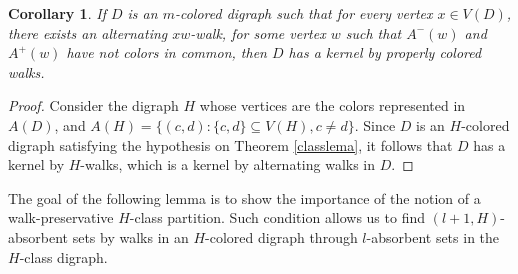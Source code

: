 \documentclass[10pt,a4paper]{article}
\newtheorem{cor}[theorem]{Corollary}
\begin{document}
\begin{cor}
If $D$ is an $m$-colored digraph such that for every vertex $x \in V(D)$, there exists an alternating $xw$-walk, for some vertex $w$ such that $A^{-}(w)$ and $A^{+}(w)$ have not colors in common, then $D$ has a kernel by properly colored walks.
\end{cor}
\begin{proof}
Consider the digraph $H$ whose vertices are the colors represented in $A(D)$, and $A(H)=\{ (c,d) : \{c, d \} \subseteq V(H), c \neq d \}$.  Since $D$ is an $H$-colored digraph satisfying the hypothesis on Theorem \ref{classlema}, it follows that $D$ has a kernel by $H$-walks, which is a kernel by alternating walks in $D$.
\end{proof}

The goal of the following lemma is to show the importance of the notion of a walk-preservative $H$-class partition. Such condition allows us to find $(l+1,H)$-absorbent sets by walks in an $H$-colored digraph through $l$-absorbent sets in the $H$-class digraph. 
\end{document}

